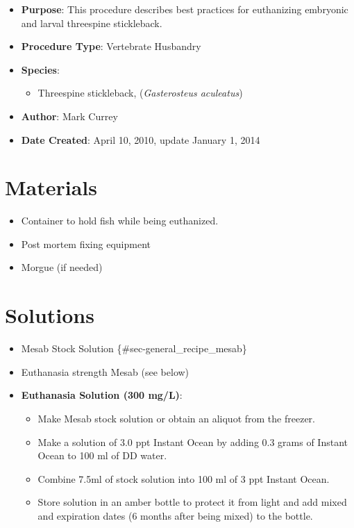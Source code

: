 \documentclass[
  letterpaper,
  DIV=11,
  numbers=noendperiod]{scrreprt}
\providecommand{\tightlist}{%
  \setlength{\itemsep}{0pt}\setlength{\parskip}{0pt}}\usepackage{longtable,booktabs,array}
\begin{document}
\begin{itemize}
\tightlist
\item
  \textbf{Purpose}: This procedure describes best practices for
  euthanizing embryonic and larval threespine stickleback.
\item
  \textbf{Procedure Type}: Vertebrate Husbandry
\item
  \textbf{Species}:

  \begin{itemize}
  \tightlist
  \item
    Threespine stickleback, (\emph{Gasterosteus aculeatus})
  \end{itemize}
\item
  \textbf{Author}: Mark Currey\\
\item
  \textbf{Date Created}: April 10, 2010, update January 1, 2014
\end{itemize}

\hypertarget{materials-53}{%
\section{Materials}\label{materials-53}}

\begin{itemize}
\tightlist
\item
  Container to hold fish while being euthanized.
\item
  Post mortem fixing equipment
\item
  Morgue (if needed)
\end{itemize}

\hypertarget{solutions-44}{%
\section{Solutions}\label{solutions-44}}

\begin{itemize}
\item
  Mesab Stock Solution \{\#sec-general\_recipe\_mesab\}
\item
  Euthanasia strength Mesab (see below)
\item
  \textbf{Euthanasia Solution (300 mg/L)}:

  \begin{itemize}
  \tightlist
  \item
    Make Mesab stock solution or obtain an aliquot from the freezer.
  \item
    Make a solution of 3.0 ppt Instant Ocean by adding 0.3 grams of
    Instant Ocean to 100 ml of DD water.
  \item
    Combine 7.5ml of stock solution into 100 ml of 3 ppt Instant Ocean.
  \item
    Store solution in an amber bottle to protect it from light and add
    mixed and expiration dates (6 months after being mixed) to the
    bottle.
  \end{itemize}
\end{itemize}
\end{document}
